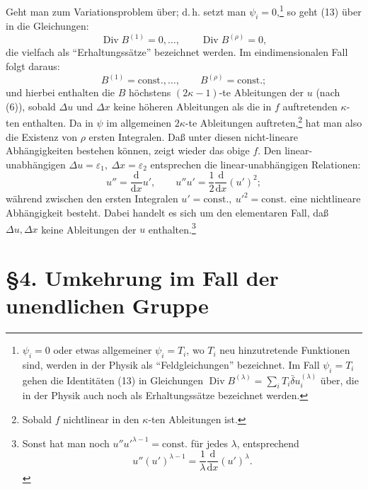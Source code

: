\documentclass[11pt]{article}
\newcommand{\D}{\Delta}
\providecommand{\eps}{\varepsilon}
\providecommand{\dd}{\mathrm d}
\providecommand{\Div}{\operatorname{Div}}
\providecommand{\bd}{\bar{\delta}}
\providecommand{\dd}{\mathrm d}
\begin{document}
Geht man zum Variationsproblem über; d.\,h. setzt man \(\psi_i=0\),\footnote{\(\psi_i=0\) oder etwas allgemeiner \(\psi_i=T_i\), wo \(T_i\) neu hinzutretende Funktionen sind, werden in der Physik als ``Feldgleichungen'' bezeichnet. Im Fall \(\psi_i=T_i\) gehen die Identitäten (13) in Gleichungen \(\Div B^{(\lambda)}=\sum_i T_i\bd u_i^{(\lambda)}\) über, die in der Physik auch noch als Erhaltungssätze bezeichnet werden.} so geht (13) über in die Gleichungen:
\[
\Div B^{(1)}=0,\ldots,\qquad \Div B^{(\rho)}=0,
\]
die vielfach als ``Erhaltungssätze'' bezeichnet werden. Im eindimensionalen Fall folgt daraus:
\[
B^{(1)}=\mathrm{const.},\ldots,\qquad B^{(\rho)}=\mathrm{const.};
\]
und hierbei enthalten die \(B\) höchstens \((2\kappa-1)\)-te Ableitungen der \(u\) (nach (6)), sobald \(\D u\) und \(\D x\) keine höheren Ableitungen als die in \(f\) auftretenden \(\kappa\)-ten enthalten. Da in \(\psi\) im allgemeinen \(2\kappa\)-te Ableitungen auftreten,\footnote{Sobald \(f\) nichtlinear in den \(\kappa\)-ten Ableitungen ist.} hat man also die Existenz von \(\rho\) ersten Integralen. Daß unter diesen nicht-lineare Abhängigkeiten bestehen können, zeigt wieder das obige \(f\). Den linear-unabhängigen \(\D u=\eps_1,\ \D x=\eps_2\) entsprechen die linear-unabhängigen Relationen:
\[
u''=\frac{\dd}{\dd x}u',\qquad
u''u'=\frac12\frac{\dd}{\dd x}(u')^2;
\]
während zwischen den ersten Integralen \(u'=\mathrm{const.},\ u'^2=\mathrm{const.}\) eine nichtlineare Abhängigkeit besteht. Dabei handelt es sich um den elementaren Fall, daß \(\D u,\D x\) keine Ableitungen der \(u\) enthalten.\footnote{Sonst hat man noch \(u''u'^{\lambda-1}=\mathrm{const.}\) für jedes \(\lambda\), entsprechend
\[
u''(u')^{\lambda-1}=\frac1\lambda\frac{\dd}{\dd x}(u')^\lambda.
\]}

\section*{\S{}4. Umkehrung im Fall der unendlichen Gruppe}
\end{document}
